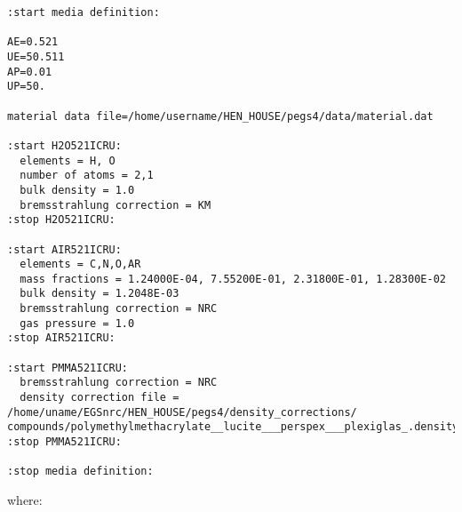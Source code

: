 \begin{verbatim}
:start media definition:

AE=0.521
UE=50.511
AP=0.01
UP=50.

material data file=/home/username/HEN_HOUSE/pegs4/data/material.dat

:start H2O521ICRU:
  elements = H, O
  number of atoms = 2,1
  bulk density = 1.0
  bremsstrahlung correction = KM
:stop H2O521ICRU:

:start AIR521ICRU:
  elements = C,N,O,AR
  mass fractions = 1.24000E-04, 7.55200E-01, 2.31800E-01, 1.28300E-02
  bulk density = 1.2048E-03
  bremsstrahlung correction = NRC
  gas pressure = 1.0
:stop AIR521ICRU:

:start PMMA521ICRU:
  bremsstrahlung correction = NRC
  density correction file = /home/uname/EGSnrc/HEN_HOUSE/pegs4/density_corrections/
compounds/polymethylmethacrylate__lucite___perspex___plexiglas_.density
:stop PMMA521ICRU:

:stop media definition:
\end{verbatim}
where:
